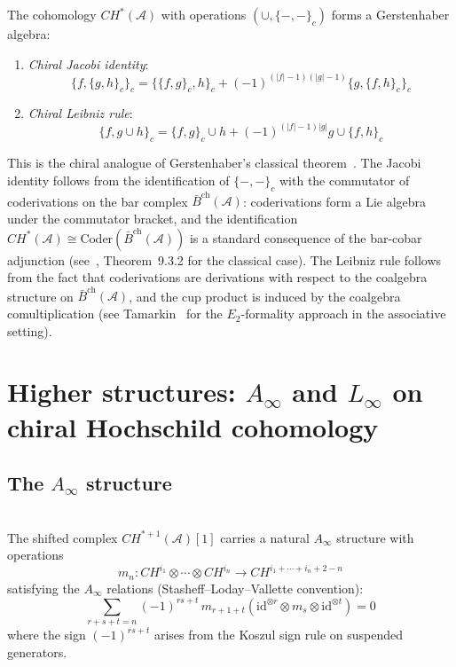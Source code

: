 \begin{theorem}
\label{thm:chiral-gerstenhaber-kps}
The cohomology $CH^*(\mathcal{A})$ with operations $(\cup, \{-,-\}_c)$ forms a Gerstenhaber algebra:
\begin{enumerate}
\item \emph{Chiral Jacobi identity}:
\[
\{f, \{g, h\}_c\}_c = \{\{f, g\}_c, h\}_c + (-1)^{(|f|-1)(|g|-1)} \{g, \{f, h\}_c\}_c
\]
\item \emph{Chiral Leibniz rule}:
\[
\{f, g \cup h\}_c = \{f, g\}_c \cup h + (-1)^{(|f|-1)|g|} g \cup \{f, h\}_c
\]
\end{enumerate}
This is the chiral analogue of Gerstenhaber's classical theorem~\cite{Ger63}.
The Jacobi identity follows from the identification of $\{-,-\}_c$ with the commutator of coderivations on the bar complex $\bar{B}^{\mathrm{ch}}(\mathcal{A})$: coderivations form a Lie algebra under the commutator bracket, and the identification $CH^*(\mathcal{A}) \cong \mathrm{Coder}(\bar{B}^{\mathrm{ch}}(\mathcal{A}))$ is a standard consequence of the bar-cobar adjunction (see~\cite{LodayVallette}, Theorem~9.3.2 for the classical case).
The Leibniz rule follows from the fact that coderivations are derivations with respect to the coalgebra structure on $\bar{B}^{\mathrm{ch}}(\mathcal{A})$, and the cup product is induced by the coalgebra comultiplication (see Tamarkin~\cite{Tamarkin00} for the $E_2$-formality approach in the associative setting).
\end{theorem}


\section{\texorpdfstring{Higher structures: $A_\infty$ and $L_\infty$ on chiral Hochschild cohomology}{Higher structures: A-infinity and L-infinity on chiral Hochschild cohomology}}

\subsection{\texorpdfstring{The $A_\infty$ structure}{The A-infinity structure}}

\begin{theorem}
\label{thm:ainfty-chiral-hochschild}
\leavevmode\\
The shifted complex $CH^{*+1}(\mathcal{A})[1]$ carries a natural
$A_\infty$ structure with operations
\[
m_n: CH^{i_1} \otimes \cdots \otimes CH^{i_n} \to CH^{i_1 + \cdots + i_n + 2 - n}
\]
satisfying the $A_\infty$ relations (Stasheff--Loday--Vallette convention):
\[
\sum_{r+s+t=n} (-1)^{rs+t}\, m_{r+1+t}(\mathrm{id}^{\otimes r} \otimes m_s \otimes \mathrm{id}^{\otimes t}) = 0
\]
where the sign $(-1)^{rs+t}$ arises from the Koszul sign rule on suspended generators.
\end{theorem}

